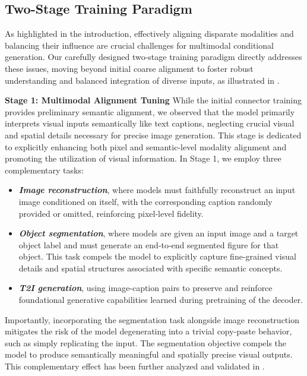 
\subsection{Two-Stage Training Paradigm}
\label{sec:traing_stages}
As highlighted in the introduction, effectively aligning disparate modalities and balancing their influence are crucial challenges for multimodal conditional generation. Our carefully designed two-stage training paradigm directly addresses these issues, moving beyond initial coarse alignment to foster robust understanding and balanced integration of diverse inputs, as illustrated in . 

\textbf{Stage 1: Multimodal Alignment Tuning}
While the initial connector training provides preliminary semantic alignment, we observed that the model primarily interprets visual inputs semantically like text captions, neglecting crucial visual and spatial details necessary for precise image generation. This stage is dedicated to explicitly enhancing both pixel and semantic-level modality alignment and promoting the utilization of visual information.
In Stage 1, we employ three complementary tasks:
\begin{itemize}[left=2pt, itemsep=0.5pt,topsep=0.5pt]
    \item \emph{\textbf{Image reconstruction}}, where models must faithfully reconstruct an input image conditioned on itself, with the corresponding caption randomly provided or omitted, reinforcing pixel-level fidelity.
    \item \emph{\textbf{Object segmentation}}, where models are given an input image and a target object label and must generate an end‐to‐end segmented figure for that object. This task compels the model to explicitly capture fine-grained visual details and spatial structures associated with specific semantic concepts.
    \item \emph{\textbf{T2I generation}}, using image-caption pairs to preserve and reinforce foundational generative capabilities learned during pretraining of the decoder.
\end{itemize}
Importantly, incorporating the segmentation task alongside image reconstruction mitigates the risk of the model degenerating into a trivial copy-paste behavior, such as simply replicating the input. The segmentation objective compels the model to produce semantically meaningful and spatially precise visual outputs. This complementary effect has been further analyzed and validated in .

